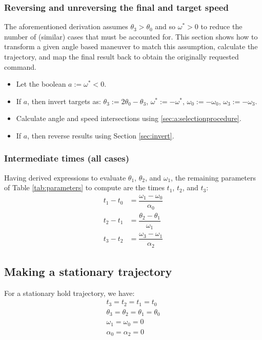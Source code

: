 \documentclass[12pt, a4paper]
{article}
\providecommand{\w}{\omega}
\providecommand{\wt}{\w^*}
\renewcommand{\th}{\theta}
\renewcommand{\a}{\alpha}
\begin{document}
\subsubsection{Reversing and unreversing the final and target speed}
\label{sec:a:reversing}
The aforementioned derivation assumes $\th_3 > \th_0$ and so $\wt > 0$ to
reduce the number of (similar) cases that must be accounted for. This section
shows how to transform a given angle based maneuver to match this assumption,
calculate the trajectory, and map the final result back to obtain the
originally requested command.

\begin{itemize}
    \item Let the boolean $a := \wt < 0$.
    \item If $a$, then invert targets as:
          $\th_3 := 2 \th_0 - \th_3$, $\wt := -\wt$, $\w_0 := -\w_0$,
          $\w_3 := -\w_3$.
    \item Calculate angle and speed intersections using
    \eqref{sec:a:selectionprocedure}.
    \item If $a$, then reverse results using Section \ref{sec:invert}.
\end{itemize}


\subsubsection{Intermediate times (all cases)}

Having derived expressions to evaluate $\th_1$, $\th_2$, and $\w_1$, the
remaining parameters of Table \ref{tab:parameters} to compute are the times
$t_1$, $t_2$, and $t_3$:
%
\begin{align}
    t_1 - t_0 &= \dfrac{\w_1-\w_0}{\a_0}\\[1em]
    t_2 - t_1 &= \dfrac{\th_2-\th_1}{\w_1}\\[1em]
    t_3 - t_2 &= \dfrac{\w_3-\w_1}{\a_2}
\end{align}

\subsection{Making a stationary trajectory}
\label{sec:stationary}
For a stationary hold trajectory, we have:
%
\begin{align}
    t_3 = t_2 = t_1 = t_0 \\[1em]
    \th_3 = \th_2 = \th_1 = \th_0 \\[1em]
    \w_1 = \w_0 = 0 \\[1em]
    \a_0 = \a_2 = 0
\end{align}
\end{document}

